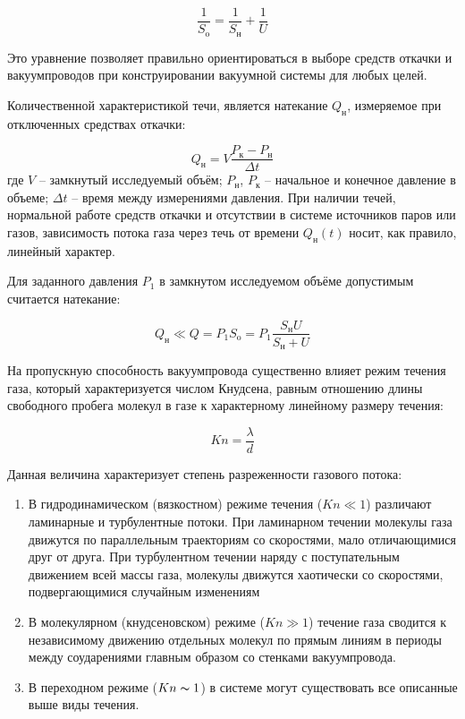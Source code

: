 \documentclass[12pt,a4paper]{article}
\begin{document}
	\begin{equation}
		\frac{1}{S_{\text{o}}} = \frac{1}{S_{\text{н}}} + \frac{1}{U}
	\end{equation}
	
	Это уравнение позволяет правильно ориентироваться в выборе средств
	откачки и вакуумпроводов при конструировании вакуумной системы для
	любых целей.
	
	Количественной характеристикой течи, является натекание $Q_{\text{н}}$, измеряемое при отключенных средствах откачки:
	
	\begin{equation}
		Q_{\text{н}} = V \frac{P_{\text{к}} - P_{\text{н}}}{\Delta t}
	\end{equation}
	где $V$ -- замкнутый исследуемый объём; $P_{\text{н}}$, $P_{\text{к}}$ -- начальное и конечное давление в объеме; $\Delta t$ -- время между измерениями давления. При наличии течей, нормальной работе средств откачки и отсутствии в системе
	источников паров или газов, зависимость потока газа через течь от времени $Q_{\text{н}}(t)$ носит, как правило, линейный характер.
	
	Для заданного давления $P_1$ в замкнутом исследуемом объёме допустимым считается натекание:
	
	\begin{equation}
		Q_{\text{н}} \ll Q = P_1 S_{\text{o}} = P_1 \frac{S_{\text{н}} U}{S_{\text{н}} + U}
	\end{equation}
	
	На пропускную способность вакуумпровода существенно влияет
	режим течения газа, который характеризуется числом Кнудсена, равным
	отношению длины свободного пробега молекул в газе к характерному
	линейному размеру течения:
	
	\begin{equation}
		Kn = \frac{\lambda}{d}
	\end{equation}
	
	Данная величина характеризует степень разреженности газового
	потока:
	\begin{enumerate}
		
		\item В гидродинамическом (вязкостном) режиме течения ($Kn \ll 1$)
		различают ламинарные и турбулентные потоки. При ламинарном
		течении молекулы газа движутся по параллельным траекториям
		со скоростями, мало отличающимися друг от друга. При турбулентном течении наряду с поступательным движением всей массы газа, молекулы движутся хаотически со скоростями, подвергающимися случайным изменениям
		
		\item В молекулярном (кнудсеновском) режиме ($Kn \gg 1$) течение газа
		сводится к независимому движению отдельных молекул по прямым линиям в периоды между соударениями главным образом со
		стенками вакуумпровода.
		
		\item В переходном режиме ($Kn \thicksim 1$) в системе могут существовать все
		описанные выше виды течения.
		
	\end{enumerate}
	
\end{document}
